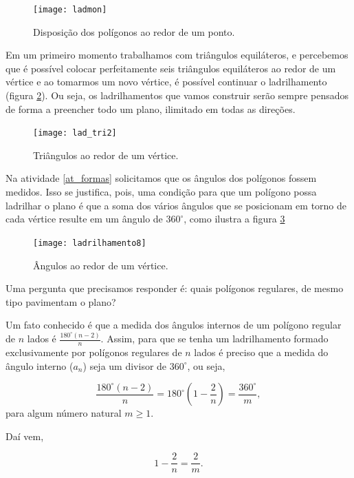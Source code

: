 \begin{figure}[H]
\centering
\texttt{[image: ladmon]}
\label{lad_reg}
\caption{Disposição dos polígonos ao redor de um ponto.}
\end{figure}

Em um primeiro momento trabalhamos com triângulos equiláteros, e percebemos que é possível colocar perfeitamente seis triângulos equiláteros ao redor de um vértice e ao tomarmos um novo vértice, é possível continuar o ladrilhamento (figura \ref{ladr_tri2}). Ou seja,  os ladrilhamentos que vamos construir serão sempre pensados de forma a preencher todo um plano, ilimitado em todas as direções. 

\begin{figure}[H]
\centering
\texttt{[image: lad\_tri2]}
\label{ladr_tri2}
\caption{Triângulos ao redor de um vértice.}
\end{figure}
 
 
Na atividade \ref{at_formas} solicitamos que os ângulos dos polígonos fossem medidos. Isso se justifica, pois, uma condição para que um polígono possa ladrilhar o plano é que a soma dos vários ângulos que se posicionam em torno de cada vértice resulte em um ângulo de $360 ^{\circ}$, como ilustra a figura \ref{angulos}

\begin{figure}[H]
\centering
\texttt{[image: ladrilhamento8]}
\label{angulos}
\caption{Ângulos ao redor de um vértice.}
\end{figure}


Uma pergunta que precisamos responder é:  quais polígonos regulares, de mesmo tipo pavimentam o plano?

Um fato conhecido é que a medida dos ângulos internos de um polígono regular de $n$ lados é $\displaystyle \frac{180^{\circ}(n-2)}{n}$. Assim, para que se tenha um ladrilhamento formado exclusivamente por polígonos regulares de $n$ lados é preciso que a medida do ângulo interno ($a_n$) seja um divisor de $360^{\circ}$, ou seja,

\begin{equation*}
\frac{180^{\circ}(n-2)}{n}=180^{\circ} \left(1 - \frac{2}{n}\right)=\frac{360^{\circ}}{m},
\end{equation*}
para algum número natural $m\geq1$.

Daí vem,

\begin{equation*}
1-\frac{2}{n}=\frac{2}{m}.
\end{equation*}

